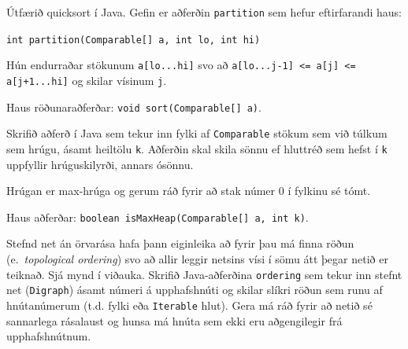 \documentclass[addpoints]{exam}
\newcommand{\eng}[1]{(e.\ \emph{#1})}
\begin{document}
\begin{questions}

	\newpage

	\question[10]

	Útfærið quicksort í Java. Gefin er aðferðin \texttt{partition} sem hefur eftirfarandi haus:
	\begin{center}
		\texttt{int partition(Comparable[] a, int lo, int hi)}
	\end{center}
	Hún endurraðar stökunum \texttt{a[lo...hi]} svo að \texttt{a[lo...j-1] <= a[j] <= a[j+1...hi]} og skilar vísinum \texttt{j}.

	Haus röðunaraðferðar: \texttt{void sort(Comparable[] a)}.


	\newpage

	\question[10]

	Skrifið aðferð í Java sem tekur inn fylki af \texttt{Comparable} stökum sem við túlkum sem hrúgu, ásamt heiltölu \texttt{k}. Aðferðin skal skila sönnu ef hluttréð sem hefst í \texttt{k} uppfyllir hrúguskilyrði, annars ósönnu.

	Hrúgan er max-hrúga og gerum ráð fyrir að stak númer 0 í fylkinu sé tómt.

	Haus aðferðar: \texttt{boolean isMaxHeap(Comparable[] a, int k)}.


	\newpage

	\question[10]

	Stefnd net án örvarása hafa þann eiginleika að fyrir þau má finna röðun \eng{topological ordering} svo að allir leggir netsins vísi í sömu átt þegar netið er teiknað. Sjá mynd í viðauka. Skrifið Java-aðferðina \texttt{ordering} sem tekur inn stefnt net (\texttt{Digraph}) ásamt númeri á upphafshnúti og skilar slíkri röðun sem runu af hnútanúmerum (t.d. fylki eða \texttt{Iterable} hlut). Gera má ráð fyrir að netið sé sannarlega rásalaust og hunsa má hnúta sem ekki eru aðgengilegir frá upphafshnútnum.


\end{questions}
\end{document}
